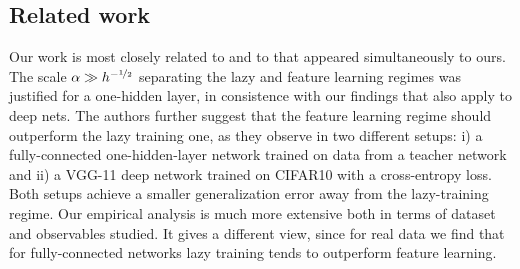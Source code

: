 \documentclass{article}
\newcommand{\st}[1]{\textcolor{black}{#1}}
\renewcommand{\cite}[1]{\citep{#1}}
\begin{document}
\subsection{Related work}
Our work is most closely related to \cite{chizat19} and to \cite{chizat:hal-01945578} that appeared simultaneously to ours. 
The scale $\alpha \gg h^{-\nicefrac12}$ separating the lazy and feature learning regimes  was justified for a one-hidden layer,
in consistence with our findings that also apply to deep nets. The authors further suggest %
that the feature learning regime should outperform the lazy training one,  as they observe in two different setups: i) a fully-connected one-hidden-layer network trained on data from a teacher network and ii) a VGG-11 deep network  trained on CIFAR10 with a cross-entropy loss. Both setups achieve a smaller generalization error away from the lazy-training regime.
Our empirical analysis is much more extensive both in terms of dataset  and observables studied. It gives a different view,
since for real data we find that for fully-connected networks lazy training  tends to outperform feature learning.

\end{document}
